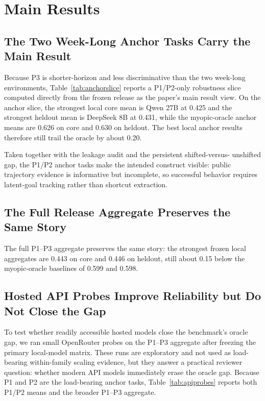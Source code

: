 \documentclass{article}
\begin{document}
\section{Main Results}

\subsection{The Two Week-Long Anchor Tasks Carry the Main Result}

Because P3 is shorter-horizon and less discriminative than the two week-long
environments, Table~\ref{tab:anchorslice} reports a P1/P2-only robustness
slice computed directly from the frozen release as the paper's main result
view. On the anchor slice, the strongest local core mean is Qwen
27B at 0.425 and the strongest heldout mean is DeepSeek 8B at 0.431, while the
myopic-oracle anchor means are 0.626 on core and 0.630 on heldout. The best
local anchor results therefore still trail the oracle by about 0.20.



Taken together with the leakage audit and the persistent shifted-versus-
unshifted gap, the P1/P2 anchor tasks make the intended construct visible:
public trajectory evidence is informative but incomplete, so successful
behavior requires latent-goal tracking rather than shortcut extraction.

\subsection{The Full Release Aggregate Preserves the Same Story}

The full P1--P3 aggregate preserves the same story: the strongest frozen local
aggregates are 0.443 on core and 0.446 on heldout, still about 0.15 below the
myopic-oracle baselines of 0.599 and 0.598.

\subsection{Hosted API Probes Improve Reliability but Do Not Close the Gap}

To test whether readily accessible hosted models close the benchmark's oracle
gap, we ran small OpenRouter probes on the P1--P3 aggregate after freezing the primary
local-model matrix. These runs are exploratory and not used as load-bearing
within-family scaling evidence, but they answer a practical reviewer question:
whether modern API models immediately erase the oracle gap. Because P1 and P2
are the load-bearing anchor tasks, Table~\ref{tab:apiprobes} reports both
P1/P2 means and the broader P1--P3 aggregate.
\end{document}
